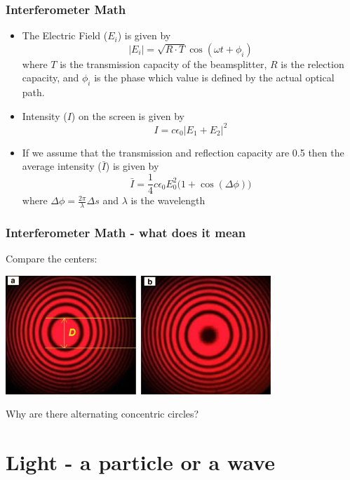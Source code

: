 \documentclass{beamer}
\begin{document}
\begin{frame}\frametitle{Interferometer Math}
\begin{itemize}
\item The Electric Field ($E_i$) is given by
\begin{equation}
\vert E_i \vert = \sqrt{R \cdot T} \cos{(\omega t + \phi_i)}
\end{equation}
where $T$ is the transmission capacity of the beamsplitter, $R$ is the relection capacity, and $\phi_i$ is the phase which value is defined by the actual optical path.
\item Intensity ($I$) on the screen is given by
\begin{equation}
I = c \epsilon_0 \vert E_1 + E_2 \vert^2
\end{equation}
\item If we assume that the transmission and reflection capacity are 0.5 then the average intensity ($\bar{I}$) is given by
\begin{equation}
\bar{I} = \frac{1}{4} c \epsilon_0 E_0^2 (1 + \cos{(\Delta \phi))}
\end{equation}
where $\Delta \phi = \frac{2 \pi}{\lambda} \Delta s$ and $\lambda$ is the wavelength
\end{itemize}
\end{frame}

\begin{frame}\frametitle{Interferometer Math - what does it mean}
Compare the centers:

\begin{center}
\includegraphics[width=10cm]{fig/fringe2.jpeg}
\end{center}

Why are there alternating concentric circles?
\end{frame}



\section{Light - a particle or a wave}
\end{document}

